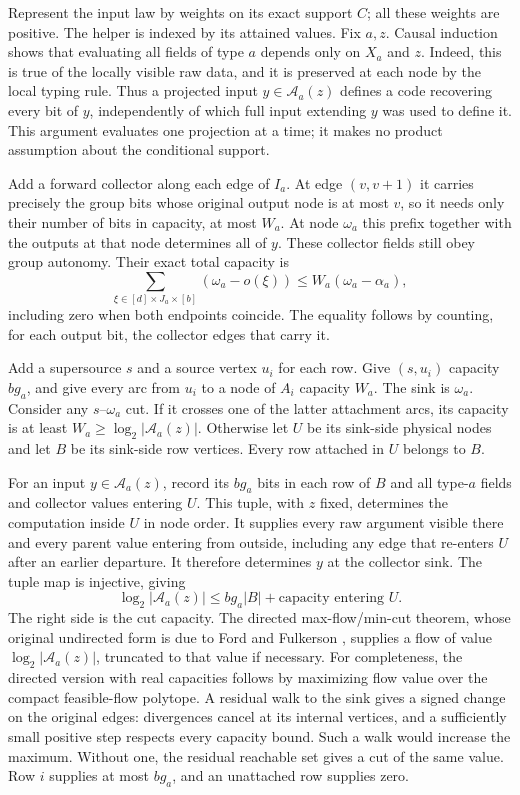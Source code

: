 \begin{outline}
Represent the input law by weights on its exact support $C$; all these
weights are positive. The helper is indexed by its attained values.
Fix $a,z$.  Causal induction shows that evaluating all fields of type
$a$ depends only on $X_a$ and $z$.  Indeed, this is true of the locally
visible raw data, and it is preserved at each node by the local typing
rule.  Thus a projected input $y\in\mathcal A_a(z)$ defines a code
recovering every bit of $y$, independently of which full input extending
$y$ was used to define it.  This argument evaluates one projection at a
time; it makes no product assumption about the conditional support.

Add a forward collector along each edge of $I_a$. At edge $(v,v+1)$ it
carries precisely the group bits whose original output node is at most
$v$, so it needs only their number of bits in capacity, at most $W_a$.
At node $\omega_a$ this prefix together with the outputs at that node
determines all of $y$. These collector fields still obey group autonomy.
Their exact total capacity is
\[
 \sum_{\xi\in[d]\times J_a\times[b]}(\omega_a-o(\xi))
 \le W_a(\omega_a-\alpha_a),
\]
including zero when both endpoints coincide. The equality follows by
counting, for each output bit, the collector edges that carry it.

Add a supersource $s$ and a source vertex $u_i$ for each row.  Give
$(s,u_i)$ capacity $bg_a$, and give every arc from $u_i$ to a node of
$A_i$ capacity $W_a$.  The sink is $\omega_a$.  Consider any
$s$--$\omega_a$ cut.  If it crosses one of the latter attachment arcs,
its capacity is at least $W_a\ge\log_2|\mathcal A_a(z)|$. Otherwise let
$U$ be its sink-side physical nodes and let $B$ be its sink-side row
vertices.  Every row attached in $U$ belongs to $B$.

For an input $y\in\mathcal A_a(z)$, record its $bg_a$ bits in each
row of $B$ and all type-$a$ fields and collector values entering $U$.
This tuple, with $z$ fixed, determines the computation inside $U$ in
node order.  It supplies every raw argument visible there and every
parent value entering from outside, including any edge that re-enters
$U$ after an earlier departure.  It therefore determines $y$ at the
collector sink.  The tuple map is injective, giving
\[
 \log_2|\mathcal A_a(z)|
 \le bg_a|B|+\text{capacity entering }U.
\]
The right side is the cut capacity. The directed max-flow/min-cut theorem,
whose original undirected form is due to Ford and Fulkerson
\cite{FordFulkerson1956}, supplies a flow of value
$\log_2|\mathcal A_a(z)|$, truncated to that value if necessary.
For completeness, the directed version with real capacities follows by
maximizing flow value over the compact feasible-flow polytope. A residual
walk to the sink gives a signed change on the original edges: divergences
cancel at its internal vertices, and a sufficiently small positive step
respects every capacity bound. Such a walk would increase the maximum.
Without one, the residual reachable set gives a cut of the same value.
Row $i$ supplies at most $bg_a$, and an unattached row supplies zero.


\end{outline}
